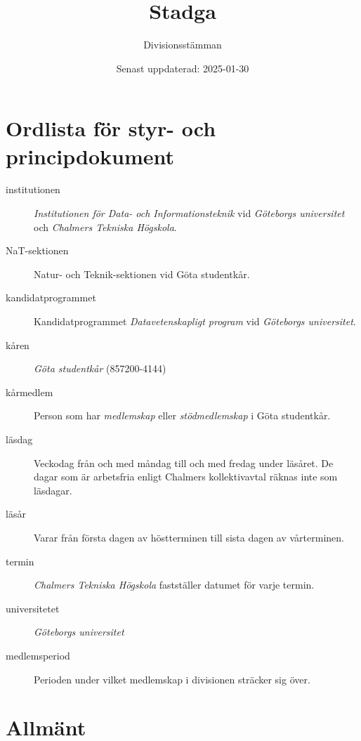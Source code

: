 \documentclass{dvd}
\begin{document}
	\title{Stadga}
	\author{Divisionsstämman}
	\date{Senast uppdaterad: 2025-01-30}

        \section{Ordlista för styr- och principdokument}

	\begin{description}
		\item[institutionen] \emph{Institutionen för Data- och Informationsteknik} vid \emph{Göteborgs universitet} och \emph{Chalmers Tekniska Högskola}.

		\item[NaT-sektionen] Natur- och Teknik-sektionen vid Göta studentkår.

		\item[kandidatprogrammet] Kandidatprogrammet \emph{Datavetenskapligt program} vid \emph{Göteborgs universitet}.

		\item[kåren] \emph{Göta studentkår} (857200-4144)

		\item[kårmedlem] Person som har \emph{medlemskap} eller \emph{stödmedlemskap} i Göta studentkår.

		\item[läsdag] Veckodag från och med måndag till och med fredag under läsåret.
					  De dagar som är arbetsfria enligt Chalmers kollektivavtal räknas inte som läsdagar.

		\item[läsår] Varar från första dagen av höstterminen till sista dagen av vårterminen.

		\item[termin] \emph{Chalmers Tekniska Högskola} fastställer datumet för varje termin.

		\item[universitetet] \emph{Göteborgs universitet}

        \item[medlemsperiod] Perioden under vilket medlemskap i divisionen sträcker sig över.
	\end{description}

	\section{Allmänt}
\end{document}
